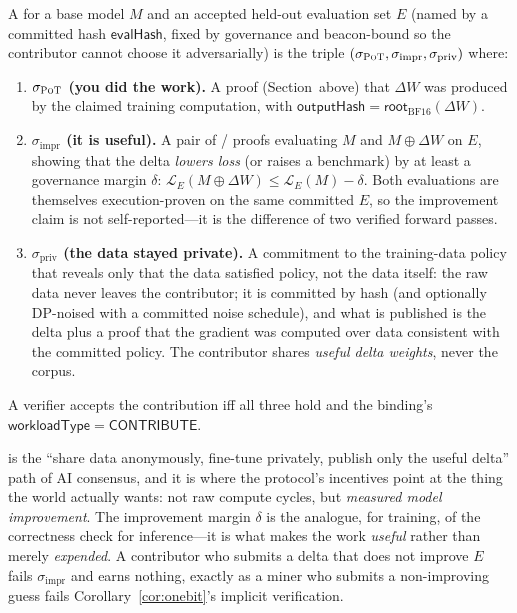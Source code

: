 \begin{definition}
\label{def:poc}
A \PoC{} for a base model $M$ and an accepted held-out evaluation set $E$ (named by
a committed hash $\mathsf{evalHash}$, fixed by governance and beacon-bound so the
contributor cannot choose it adversarially) is the triple $(\sigma_{\textsc{PoT}{}},
\sigma_{\mathrm{impr}}, \sigma_{\mathrm{priv}})$ where:
\begin{enumerate}[leftmargin=1.6em]
\item \textbf{$\sigma_{\textsc{PoT}{}}$ (you did the work).} A \PoT{} proof
(Section~above) that $\Delta W$ was produced by the claimed training computation,
with $\mathsf{outputHash} = \mathsf{root}_{\mathrm{BF16}}(\Delta W)$.
\item \textbf{$\sigma_{\mathrm{impr}}$ (it is useful).} A pair of \PoE{}/\PoI{}
proofs evaluating $M$ and $M \oplus \Delta W$ on $E$, showing that the delta
\emph{lowers loss} (or raises a benchmark) by at least a governance margin $\delta$:
$\mathcal{L}_E(M \oplus \Delta W) \le \mathcal{L}_E(M) - \delta$. Both evaluations
are themselves execution-proven on the same committed $E$, so the improvement claim
is not self-reported---it is the difference of two verified forward passes.
\item \textbf{$\sigma_{\mathrm{priv}}$ (the data stayed private).} A commitment to
the training-data policy that reveals only that the data satisfied policy, not the
data itself: the raw data never leaves the contributor; it is committed by hash (and
optionally DP-noised with a committed noise schedule), and what is published is the
delta plus a proof that the gradient was computed over data consistent with the
committed policy. The contributor shares \emph{useful delta weights}, never the
corpus.
\end{enumerate}
A verifier accepts the contribution iff all three hold and the binding's
$\mathsf{workloadType} = \mathsf{CONTRIBUTE}$.
\end{definition}

\PoC{} is the ``share data anonymously, fine-tune privately, publish only the useful
delta'' path of AI consensus, and it is where the protocol's incentives point at the
thing the world actually wants: not raw compute cycles, but \emph{measured model
improvement}. The improvement margin $\delta$ is the analogue, for training, of the
correctness check for inference---it is what makes the work \emph{useful} rather than
merely \emph{expended}. A contributor who submits a delta that does not improve $E$
fails $\sigma_{\mathrm{impr}}$ and earns nothing, exactly as a miner who submits a
non-improving guess fails Corollary~\ref{cor:onebit}'s implicit verification.

